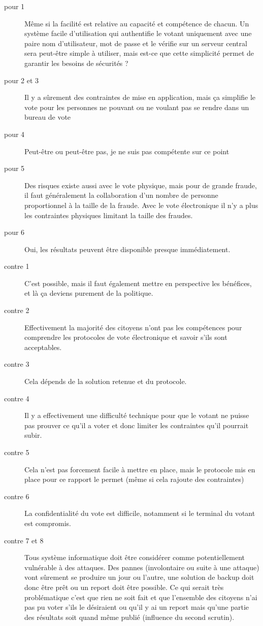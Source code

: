 \documentclass[../report]{subfiles}
\begin{document}
\begin{description}
	\item[pour 1] Même si la facilité est relative au capacité et compétence de chacun. 
		Un système facile d'utilisation qui authentifie le votant uniquement avec une 
		paire nom d'utilisateur, mot de passe et le vérifie sur un serveur central sera 
		peut-être simple à utiliser, mais est-ce que cette simplicité permet de garantir 
		les besoins de sécurités ?
	\item[pour 2 et 3] Il y a sûrement des contraintes de mise en application, mais ça simplifie 
	 	le vote pour les personnes ne pouvant ou ne voulant pas se rendre dans un bureau de vote
 	\item[pour 4] Peut-être ou peut-être pas, je ne suis pas compétente sur ce point
 	\item[pour 5] Des risques existe aussi avec le vote physique, mais pour de grande fraude, il 
 		faut généralement la collaboration d'un nombre de personne proportionnel à la taille de la fraude.
 		Avec le vote électronique il n'y a plus les contraintes physiques limitant la taille des fraudes.
 	\item[pour 6] Oui, les résultats peuvent être disponible presque immédiatement.
 	\item[contre 1] C'est possible, mais il faut également mettre en perspective les bénéfices, et là ça 
 		deviens purement de la politique.
 	\item[contre 2] Effectivement la majorité des citoyens n'ont pas les compétences pour comprendre 
 		les protocoles de vote électronique et savoir s'ils sont acceptables.
 	\item[contre 3] Cela dépends de la solution retenue et du protocole.
 	\item[contre 4] Il y a effectivement une difficulté technique pour que le votant ne puisse pas
 		prouver ce qu'il a voter et donc limiter les contraintes qu'il pourrait subir.
 	\item[contre 5] Cela n'est pas forcement facile à mettre en place, mais le protocole mis en place 
 		pour ce rapport le permet (même si cela rajoute des contraintes)
 	\item[contre 6] La confidentialité du vote est difficile, notamment si le terminal du votant est compromis.
 	\item[contre 7 et 8] Tous système informatique doit être considérer comme potentiellement vulnérable à des attaques.
 		Des pannes (involontaire ou suite à une attaque) vont sûrement se produire un jour ou l'autre, une solution de backup
 		doit donc être prêt ou un report doit être possible. Ce qui serait très problématique c'est que rien ne soit fait 
 		et que l'ensemble des citoyens n'ai pas pu voter s'ils le désiraient ou qu'il y ai un report mais qu'une partie des 
 		résultats soit quand même publié (influence du second scrutin).
\end{description}
\end{document}
